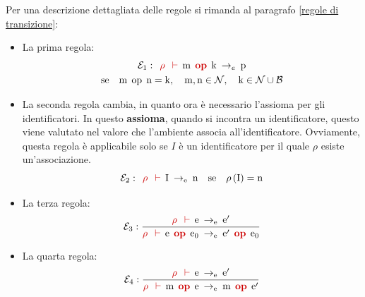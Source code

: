 \documentclass[a4paper]{article}
\begin{document}
	Per una descrizione dettagliata delle regole si rimanda al paragrafo \ref{regole di transizione}:
	\begin{itemize}
		\item La prima regola:
		\begin{gather*}
			\mathcal{E}_{1} : \:\: \textcolor{Red3}{\rho \:\: \vdash} \:\: \mathrm{m} \:\: \textcolor{Red3}{\mathbf{op}} \:\: \mathrm{k} \: \rightarrow_{e} \: \mathrm{p} \\
			\mathrm{se} \hspace{1em} \mathrm{m} \:\: \mathrm{op} \:\: \mathrm{n} = \mathrm{k}, \hspace{1em} \mathrm{m,n} \in \mathcal{N}, \hspace{1em} \mathrm{k} \in \mathcal{N} \cup \mathcal{B}
		\end{gather*}
		
		\item La seconda regola cambia, in quanto ora è necessario l'assioma per gli identificatori. In questo \textbf{assioma}, quando si incontra un identificatore, questo viene valutato nel valore che l'ambiente associa all'identificatore. Ovviamente, questa regola è applicabile solo se $I$ è un identificatore per il quale $\rho$ esiste un'associazione.
		\begin{equation*}
			\mathcal{E}_{2} : \:\: \textcolor{Red3}{\rho \:\: \vdash} \:\: \mathrm{I} \: \rightarrow_{\mathrm{e}} \: \mathrm{n} \hspace{1em} \mathrm{se} \hspace{1em} \rho\left(\mathrm{I}\right) = \mathrm{n}
		\end{equation*}
		
		\item La terza regola:
		\begin{equation*}
			\mathcal{E}_{3} : \dfrac{
			\textcolor{Red3}{\rho \:\: \vdash} \:\: \mathrm{e} \: \rightarrow_{\mathrm{e}} \: \mathrm{e}'
			}{
			\textcolor{Red3}{\rho \:\: \vdash} \:\: \mathrm{e} \:\: \textcolor{Red3}{\mathrm{\mathbf{op}}} \:\: \mathrm{e}_{0} \: \rightarrow_{\mathrm{e}} \: \mathrm{e}' \:\: \textcolor{Red3}{\mathrm{\mathbf{op}}} \:\: \mathrm{e}_{0}
			}
		\end{equation*}
		
		\item La quarta regola:
		\begin{equation*}
			\mathcal{E}_{4} : \dfrac{
				\textcolor{Red3}{\rho \:\: \vdash} \:\: \mathrm{e} \: \rightarrow_{\mathrm{e}} \: \mathrm{e}'
			}{
				\textcolor{Red3}{\rho \:\: \vdash} \:\: \mathrm{m} \:\: \textcolor{Red3}{\mathrm{\mathbf{op}}} \:\: \mathrm{e} \: \rightarrow_{\mathrm{e}} \: \mathrm{m} \:\: \textcolor{Red3}{\mathrm{\mathbf{op}}} \:\: \mathrm{e}'
			}
		\end{equation*}
		

\end{itemize}
\end{document}
